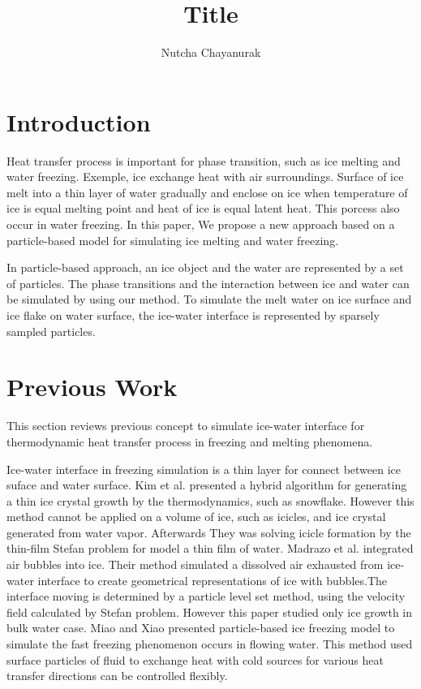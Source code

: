 \documentclass[10pt, twocolumn] {IEEEtran}
\begin{document}
\title{Title}
\author{Nutcha Chayanurak}
\maketitle
\begin{abstract} 
 \end{abstract}
\section{Introduction}
Heat transfer process is important for phase transition, such as ice melting and water freezing. Exemple, ice exchange heat with air surroundings. Surface of ice melt into a thin layer of water  gradually and enclose on ice when temperature of ice is equal melting point and heat of ice is equal latent heat. This porcess also occur in water freezing. In this paper, We propose a new approach based on 
a particle-based model for simulating ice melting and water freezing. 

In particle-based approach, an ice object and the water are represented by a set of particles. The phase transitions and the interaction between ice and water can be simulated by using our method. To simulate the melt water on ice surface and ice flake on water surface, the ice-water interface is represented by sparsely sampled particles.    

 
\section{Previous Work}
This section reviews previous concept to simulate ice-water interface for thermodynamic heat transfer process in freezing and melting phenomena. 

Ice-water interface in freezing simulation is a thin layer for connect between ice suface and water surface. Kim et al.\cite{kim2004hybrid} presented a hybrid algorithm for generating a thin ice crystal growth by the thermodynamics, such as snowflake. However this method cannot be applied on a volume of ice, such as icicles, and ice crystal generated from water vapor. Afterwards They was solving icicle formation by the thin-film Stefan problem for model a thin film of water\cite{kim2006modeling}. Madrazo et al. integrated air bubbles into ice\cite{madrazo2009air}. Their method simulated a dissolved air exhausted from ice-water interface to create geometrical representations of ice with bubbles.The interface moving is determined by a particle level set method, using the velocity field calculated by Stefan problem. However this paper studied only ice growth in bulk water case. Miao and Xiao\cite{Miao:2015:PIF:2817675.2817676} presented particle-based ice freezing model to simulate the fast freezing phenomenon occurs in flowing water. This method used surface particles of fluid to exchange heat with cold sources for various heat transfer directions can be controlled flexibly.
 
\end{document}
